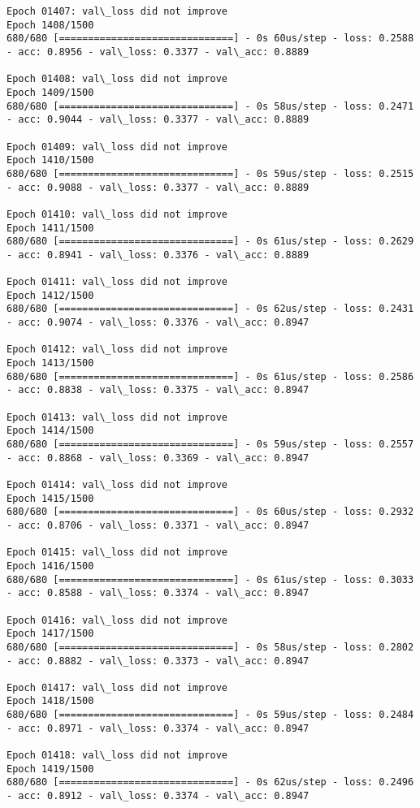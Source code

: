 \documentclass[11pt]{article}
\begin{document}
\begin{Verbatim}[commandchars=\\\{\}]
Epoch 01407: val\_loss did not improve
Epoch 1408/1500
680/680 [==============================] - 0s 60us/step - loss: 0.2588 - acc: 0.8956 - val\_loss: 0.3377 - val\_acc: 0.8889

Epoch 01408: val\_loss did not improve
Epoch 1409/1500
680/680 [==============================] - 0s 58us/step - loss: 0.2471 - acc: 0.9044 - val\_loss: 0.3377 - val\_acc: 0.8889

Epoch 01409: val\_loss did not improve
Epoch 1410/1500
680/680 [==============================] - 0s 59us/step - loss: 0.2515 - acc: 0.9088 - val\_loss: 0.3377 - val\_acc: 0.8889

Epoch 01410: val\_loss did not improve
Epoch 1411/1500
680/680 [==============================] - 0s 61us/step - loss: 0.2629 - acc: 0.8941 - val\_loss: 0.3376 - val\_acc: 0.8889

Epoch 01411: val\_loss did not improve
Epoch 1412/1500
680/680 [==============================] - 0s 62us/step - loss: 0.2431 - acc: 0.9074 - val\_loss: 0.3376 - val\_acc: 0.8947

Epoch 01412: val\_loss did not improve
Epoch 1413/1500
680/680 [==============================] - 0s 61us/step - loss: 0.2586 - acc: 0.8838 - val\_loss: 0.3375 - val\_acc: 0.8947

Epoch 01413: val\_loss did not improve
Epoch 1414/1500
680/680 [==============================] - 0s 59us/step - loss: 0.2557 - acc: 0.8868 - val\_loss: 0.3369 - val\_acc: 0.8947

Epoch 01414: val\_loss did not improve
Epoch 1415/1500
680/680 [==============================] - 0s 60us/step - loss: 0.2932 - acc: 0.8706 - val\_loss: 0.3371 - val\_acc: 0.8947

Epoch 01415: val\_loss did not improve
Epoch 1416/1500
680/680 [==============================] - 0s 61us/step - loss: 0.3033 - acc: 0.8588 - val\_loss: 0.3374 - val\_acc: 0.8947

Epoch 01416: val\_loss did not improve
Epoch 1417/1500
680/680 [==============================] - 0s 58us/step - loss: 0.2802 - acc: 0.8882 - val\_loss: 0.3373 - val\_acc: 0.8947

Epoch 01417: val\_loss did not improve
Epoch 1418/1500
680/680 [==============================] - 0s 59us/step - loss: 0.2484 - acc: 0.8971 - val\_loss: 0.3374 - val\_acc: 0.8947

Epoch 01418: val\_loss did not improve
Epoch 1419/1500
680/680 [==============================] - 0s 62us/step - loss: 0.2496 - acc: 0.8912 - val\_loss: 0.3374 - val\_acc: 0.8947


\end{Verbatim}
\end{document}
